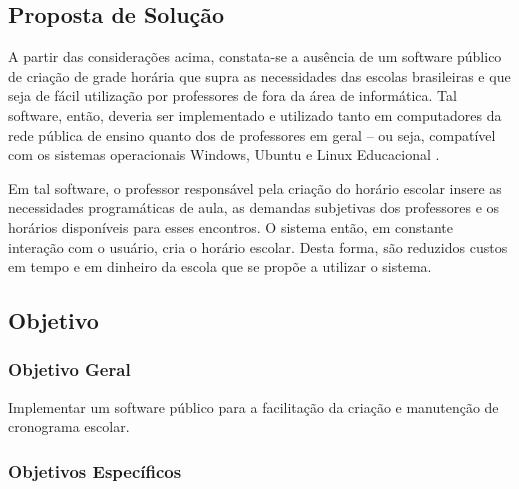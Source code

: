 \documentclass[12pt,a4paper]{article}
\begin{document}
		\subsection{Proposta de Solução}

			 \par A partir das considerações acima, constata-se a ausência de um software público \cite{publico} de criação de grade horária que supra as necessidades das escolas brasileiras e que seja de fácil utilização por professores de fora da área de informática. Tal software, então, deveria ser implementado e utilizado tanto em computadores da rede pública de ensino quanto dos de professores em geral -- ou seja, compatível com os sistemas operacionais Windows, Ubuntu e Linux Educacional \cite{proinfo,w3s}.

			 \par Em tal software, o professor responsável pela criação do horário escolar insere as necessidades programáticas de aula, as demandas subjetivas dos professores e os horários disponíveis para esses encontros. O sistema então, em constante interação com o usuário, cria o horário escolar.  Desta forma, são reduzidos custos em tempo e em dinheiro da escola que se propõe a utilizar o sistema.

		\subsection{Objetivo}

			\subsubsection{Objetivo Geral}

				\par Implementar um software público para a facilitação da criação e manutenção de cronograma escolar.

			\subsubsection{Objetivos Específicos}
\end{document}
